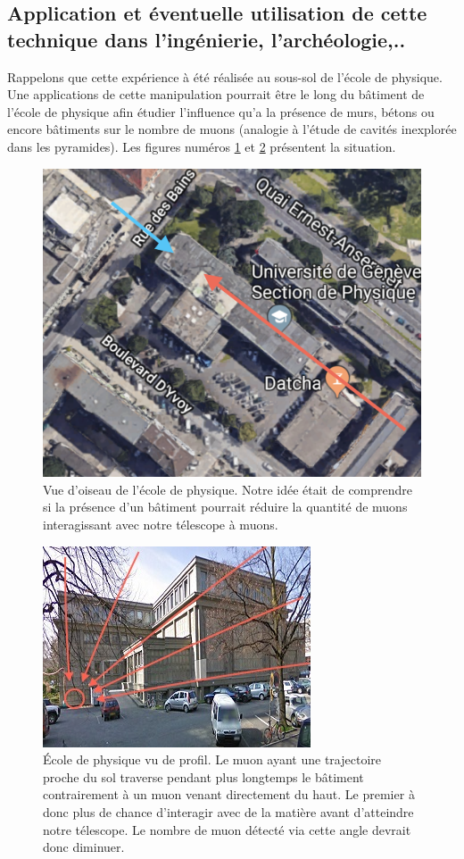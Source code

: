 \documentclass[12pt]{article}
\begin{document}
\subsection{Application et éventuelle utilisation de cette technique dans l'ingénierie, l'archéologie,.. }

Rappelons que cette expérience à été réalisée au sous-sol de l'école de physique. Une applications de cette manipulation pourrait être le long du bâtiment de l'école de physique afin étudier l'influence qu'a la présence de murs, bétons ou encore bâtiments sur le nombre de muons (analogie à l'étude de cavités inexplorée dans les pyramides). Les figures numéros \ref{fig:ecole_phys_vue_du_dessus} et \ref{fig:ecole_phys_vue_du_prof} présentent la situation.


\begin{figure}[htpb!]
    \centering
    \includegraphics[width=0.6\linewidth]{graphiques/experience2/gmap_ecole_phy_vue_dessus.png}
    \caption{Vue d'oiseau de l'école de physique. Notre idée était de comprendre si la présence d'un bâtiment pourrait réduire la quantité de muons interagissant avec notre télescope à muons. }
    \label{fig:ecole_phys_vue_du_dessus}
\end{figure}

\begin{figure}[htpb!]
    \centering
    \includegraphics[width=0.6\linewidth]{graphiques/experience2/gmap_ecole_de_phys_vu_prof.jpg}
    \caption{École de physique vu de profil. Le muon ayant une trajectoire proche du sol traverse pendant plus longtemps le bâtiment contrairement à un muon venant directement du haut. Le premier à donc plus de chance d'interagir avec de la matière avant d'atteindre notre télescope. Le nombre de muon détecté via cette angle devrait donc diminuer.}
    \label{fig:ecole_phys_vue_du_prof}
\end{figure}
\end{document}
